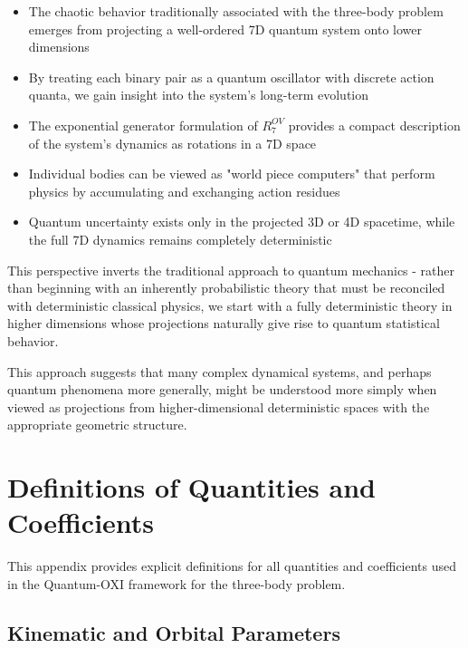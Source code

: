 \documentclass{article}
\begin{document}
\begin{itemize}
\item The chaotic behavior traditionally associated with the three-body problem emerges from projecting a well-ordered 7D quantum system onto lower dimensions
\item By treating each binary pair as a quantum oscillator with discrete action quanta, we gain insight into the system's long-term evolution
\item The exponential generator formulation of $R^{OV}_7$ provides a compact description of the system's dynamics as rotations in a 7D space
\item Individual bodies can be viewed as "world piece computers" that perform physics by accumulating and exchanging action residues
\item Quantum uncertainty exists only in the projected 3D or 4D spacetime, while the full 7D dynamics remains completely deterministic
\end{itemize}

This perspective inverts the traditional approach to quantum mechanics - rather than beginning with an inherently probabilistic theory that must be reconciled with deterministic classical physics, we start with a fully deterministic theory in higher dimensions whose projections naturally give rise to quantum statistical behavior.

This approach suggests that many complex dynamical systems, and perhaps quantum phenomena more generally, might be understood more simply when viewed as projections from higher-dimensional deterministic spaces with the appropriate geometric structure.

\appendix
\section{Definitions of Quantities and Coefficients}
\label{appendix:definitions}

This appendix provides explicit definitions for all quantities and coefficients used in the Quantum-OXI framework for the three-body problem.

\subsection{Kinematic and Orbital Parameters}
\end{document}
